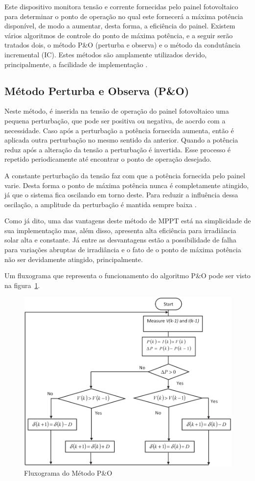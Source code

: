 \documentclass[
	12pt,				%
	openright,			%
	onseside,
	a4paper,			%
	english,			%
	french,				%
	spanish,			%
	brazil,				%
	]{abntex2}
\begin{document}
Este dispositivo monitora tensão e corrente fornecidas pelo painel fotovoltaico para determinar o ponto de operação no qual este fornecerá a máxima potência disponível, de modo a aumentar, desta forma, a eficiência do painel. Existem vários algoritmos de controle do ponto de máxima potência, e a seguir serão tratados dois, o método P\&O (perturba e observa) e o método da condutância incremental (IC). Estes métodos são amplamente utilizados devido, principalmente, a facilidade de implementação \cite{MPPT_P&O_IC}\cite{Talha_MPPT}.


\subsection{Método Perturba e Observa (P\&O)}

Neste método, é inserida na tensão de operação do painel fotovoltaico uma pequena perturbação, que pode ser positiva ou negativa, de aocrdo com a necessidade. Caso após a perturbação a potência fornecida aumenta, então é aplicada outra perturbação no mesmo sentido da anterior. Quando a potência reduz após a alteração da tensão a perturbação é invertida. Esse processo é repetido periodicamente até encontrar o ponto de operação desejado\cite{Talha_MPPT}.

A constante perturbação da tensão faz com que a potência fornecida pelo painel varie. Desta forma o ponto de máxima potência nunca é completamente atingido, já que o sistema fica oscilando em torno deste. Para reduzir a influência dessa oscilação, a amplitude da perturbação é mantida sempre baixa \cite{MPPT_P&O_IC}.

Como já dito, uma das vantagens deste método de MPPT está na simplicidade de sua implementação mas, além disso, apresenta alta eficiência para irradiância solar alta e constante. Já entre as desvantagens estão a possibilidade de falha para variações abruptas de irradiância e o fato de o ponto de máxima potência não ser devidamente atingido, principalmente\cite{MPPT_P&O_IC}.

Um fluxograma que representa o funcionamento do algoritmo P\&O pode ser visto na figura~\ref{fig:PeO_Flux}.

\begin{figure}[htbp]
	\begin{center}
		\includegraphics[width=0.55 \linewidth]{peo_flow}
		\caption{Fluxograma do Método P\&O \cite{Talha_MPPT}}
		\label{fig:PeO_Flux}
	\end{center}
\end{figure}
\end{document}
